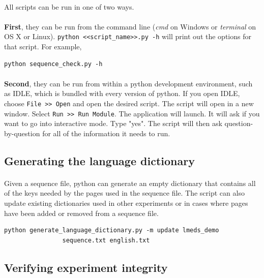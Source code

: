 \documentclass[12pt, oneside]{scrbook}   	%
\begin{document}
\paragraph{}
All scripts can be run in one of two ways.  

\paragraph{}
\textbf{First}, they can be run from the command line (\textit{cmd} on Windows or \textit{terminal} on OS X or Linux).  \texttt{python <<script\_name>>.py -h} will print out the options for that script.  For example, 
\begin{lstlisting}
python sequence_check.py -h
\end{lstlisting}

\paragraph{}
\textbf{Second}, they can be run from within a python development environment, such as IDLE, which is bundled with every version of python.  If you open IDLE, choose \texttt{File >> Open} and open the desired script.  The script will open in a new window.  Select \texttt{Run >> Run Module}.  The application will launch.  It will ask if you want to go into interactive mode.  Type "yes".  The script will then ask question-by-question for all of the information it needs to run.

\subsection{Generating the language dictionary}

\paragraph{}
Given a sequence file, python can generate an empty dictionary that contains all of the keys needed by the pages used in the sequence file.  The script can also update existing dictionaries used in other experiments or in cases where pages have been added or removed from a sequence file.

\begin{lstlisting}
python generate_language_dictionary.py -m update lmeds_demo 
				sequence.txt english.txt
\end{lstlisting}

\subsection{Verifying experiment integrity}
\end{document}
